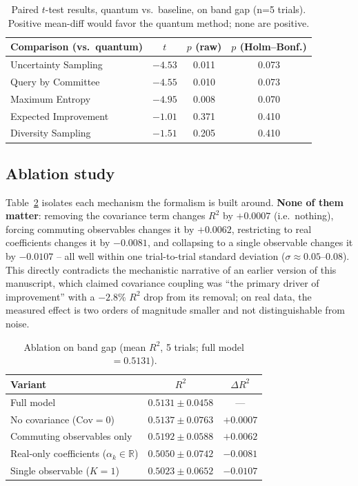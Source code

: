 \documentclass[conference]{IEEEtran}
\begin{document}
\begin{table}[!t]
\centering
\caption{Paired $t$-test results, quantum vs.\ baseline, on band gap (n=5 trials). Positive mean-diff would favor the quantum method; none are positive.}
\label{tab:stats}
\begin{tabular}{lccc}
\toprule
Comparison (vs.\ quantum) & $t$ & $p$ (raw) & $p$ (Holm--Bonf.) \\
\midrule
Uncertainty Sampling & $-4.53$ & 0.011 & 0.073 \\
Query by Committee & $-4.55$ & 0.010 & 0.073 \\
Maximum Entropy & $-4.95$ & 0.008 & 0.070 \\
Expected Improvement & $-1.01$ & 0.371 & 0.410 \\
Diversity Sampling & $-1.51$ & 0.205 & 0.410 \\
\bottomrule
\end{tabular}
\end{table}

\subsection{Ablation study}

Table~\ref{tab:ablation} isolates each mechanism the formalism is built around. \textbf{None of them matter}: removing the covariance term changes $R^2$ by $+0.0007$ (i.e.\ nothing), forcing commuting observables changes it by $+0.0062$, restricting to real coefficients changes it by $-0.0081$, and collapsing to a single observable changes it by $-0.0107$ -- all well within one trial-to-trial standard deviation ($\sigma\approx 0.05$--$0.08$). This directly contradicts the mechanistic narrative of an earlier version of this manuscript, which claimed covariance coupling was ``the primary driver of improvement'' with a $-2.8\%$ $R^2$ drop from its removal; on real data, the measured effect is two orders of magnitude smaller and not distinguishable from noise.

\begin{table}[!t]
\centering
\caption{Ablation on band gap (mean $R^2$, 5 trials; full model $=0.5131$).}
\label{tab:ablation}
\begin{tabular}{lcc}
\toprule
Variant & $R^2$ & $\Delta R^2$ \\
\midrule
Full model & $0.5131 \pm 0.0458$ & --- \\
No covariance ($\mathrm{Cov}=0$) & $0.5137 \pm 0.0763$ & $+0.0007$ \\
Commuting observables only & $0.5192 \pm 0.0588$ & $+0.0062$ \\
Real-only coefficients ($\alpha_k\in\mathbb{R}$) & $0.5050 \pm 0.0742$ & $-0.0081$ \\
Single observable ($K=1$) & $0.5023 \pm 0.0652$ & $-0.0107$ \\
\bottomrule
\end{tabular}
\end{table}
\end{document}
